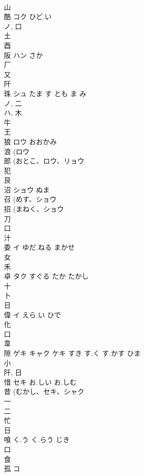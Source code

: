 \documentclass[8pt]{extreport}
\begin{document}
\begin{CJK}{UTF8}{min}
\\	山 
\\	酷	コク	ひど.い	
\\	ノ, 口 
\\	土 
\\	酉 
\\	阪	ハン	さか	
\\	厂 
\\	又 
\\	阡	
\\	珠	シュ	たま す とも ま み	
\\	ノ, 二 
\\	ハ, 木 
\\	牛 
\\	王 
\\	狼	ロウ	おおかみ	
\\	浪 (ロウ 
\\	郎 (おとこ、ロウ、リョウ 
\\	犯 
\\	艮 
\\	沼	ショウ	ぬま	
\\	召 (めす、ショウ 
\\	招 (まねく、ショウ 
\\	刀 
\\	口 
\\	汁 
\\	委	イ	ゆだ.ねる まかせ	
\\	女 
\\	禾 
\\	卓	タク	すぐる たか たかし	
\\	十 
\\	卜 
\\	日 
\\	偉	イ	えら.い ひで	
\\	化 
\\	口 
\\	韋 
\\	隙	ゲキ キャク ケキ	すき す.く す.かす ひま	
\\	小 
\\	阡, 日 
\\	惜	セキ	お.しい お.しむ	
\\	昔 (むかし、セキ、シャク 
\\	一 
\\	二 
\\	忙 
\\	日 
\\	喰		く.う く.らう じき	
\\	口 
\\	食 
\\	孤	コ		

\end{CJK}
\end{document}
